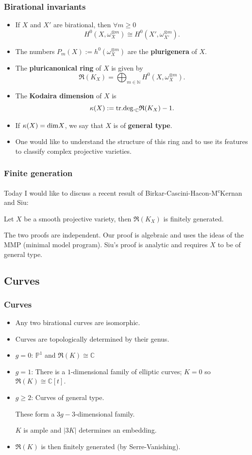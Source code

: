 \documentclass{beamer}
\theoremstyle{plain}
\theoremstyle{definition}
\theoremstyle{remark}
\begin{document}
\begin{frame}
  \frametitle{Birational invariants}
\begin{itemize}
\item If $X$ and $X'$ are birational, then $\forall m\geq 0$
$$H^0(X,\omega _{X}^{\otimes m})\cong H^0(X',\omega _{X'}^{\otimes m}).$$ 
\pause
\item The numbers $P_m(X):=h^0(\omega _{X}^{\otimes m})$ are the {\bf plurigenera} of $X$.
\pause
\item The {\bf pluricanonical ring} of $X$ is given by $$\mathfrak{R}(K_X)=\bigoplus _{m\in \mathbb {N}}H^0(X,\omega _{X}^{\otimes m}).$$ 
\pause
\item The {\bf Kodaira dimension} of $X$ is $$\kappa (X):={\rm tr.deg.}_{\mathbb {C}} \mathfrak{R}(K_X) -1.$$
\pause
\item If $\kappa (X)={\rm dim}X$, we say that $X$ is of {\bf general type}.
\pause
\item One would like to understand the structure of this ring and to use its features to classify complex projective varieties.
\end{itemize}

\end{frame}
\begin{frame}
  \frametitle{Finite generation}
Today I would like to discuss a recent result of
Birkar-Cascini-Hacon-M\textsuperscript{c}Kernan and Siu:
\begin{theorem} Let $X$ be a smooth projective variety, then $  \mathfrak{R}(K_X)$ is finitely generated.\end{theorem}
\pause
The two proofs are independent. Our proof is algebraic and uses the ideas of the MMP (minimal model program). Siu's proof is analytic and requires $X$ to be of general type.
\end{frame}
\subsection{Curves}

\begin{frame}
  \frametitle{Curves}
\begin{itemize}
\item Any two birational curves are isomorphic.
\pause
\item Curves are topologically determined by their genus. 
\pause
\item $g=0$: ${\mathbb P} ^1$ and $\mathfrak{R}(K)\cong \mathbb {C}$
\pause
\item $g=1$: There is a $1$-dimensional family of elliptic curves; $K=0$ so 
$\mathfrak{R}(K)\cong \mathbb {C}[t]$.
\pause
\item $g\geq 2$: Curves of general type. 

These form a $3g-3$-dimensional family.  

$K$ is ample and $|3K|$ determines an embedding.

\pause
\item $\mathfrak{R}(K)$ is then finitely generated (by Serre-Vanishing).
\end{itemize}

\end{frame}
\end{document}
